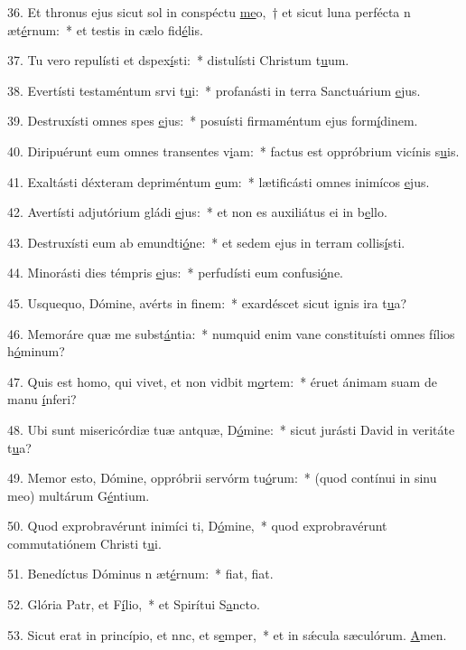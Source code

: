 36. Et thronus ejus sicut sol in conspéctu \uline{me}o,~† et sicut luna perfécta n æt\uline{é}rnum:~* et testis in cælo fid\uline{é}lis.\par 
37. Tu vero repulísti et dspex\uline{í}sti:~* distulísti Christum t\uline{u}um.\par 
38. Evertísti testaméntum srvi t\uline{u}i:~* profanásti in terra Sanctuárium \uline{e}jus.\par 
39. Destruxísti omnes spes \uline{e}jus:~* posuísti firmaméntum ejus form\uline{í}dinem.\par 
40. Diripuérunt eum omnes transentes v\uline{i}am:~* factus est oppróbrium vicínis s\uline{u}is.\par 
41. Exaltásti déxteram depriméntum \uline{e}um:~* lætificásti omnes inimícos \uline{e}jus.\par 
42. Avertísti adjutórium gládi \uline{e}jus:~* et non es auxiliátus ei in b\uline{e}llo.\par 
43. Destruxísti eum ab emundti\uline{ó}ne:~* et sedem ejus in terram collis\uline{í}sti.\par 
44. Minorásti dies témpris \uline{e}jus:~* perfudísti eum confusi\uline{ó}ne.\par 
45. Usquequo, Dómine, avérts in f\uline{i}nem:~* exardéscet sicut ignis ira t\uline{u}a?\par 
46. Memoráre quæ me subst\uline{á}ntia:~* numquid enim vane constituísti omnes fílios h\uline{ó}minum?\par 
47. Quis est homo, qui vivet, et non vidbit m\uline{o}rtem:~* éruet ánimam suam de manu \uline{í}nferi?\par 
48. Ubi sunt misericórdiæ tuæ antquæ, D\uline{ó}mine:~* sicut jurásti David in veritáte t\uline{u}a?\par 
49. Memor esto, Dómine, oppróbrii servórm tu\uline{ó}rum:~* (quod contínui in sinu meo) multárum G\uline{é}ntium.\par 
50. Quod exprobravérunt inimíci ti, D\uline{ó}mine,~* quod exprobravérunt commutatiónem Christi t\uline{u}i.\par 
51. Benedíctus Dóminus n æt\uline{é}rnum:~* fiat, f\uline{i}at.\par 
52. Glória Patr, et F\uline{í}lio,~* et Spirítui S\uline{a}ncto.\par 
53. Sicut erat in princípio, et nnc, et s\uline{e}mper,~* et in sǽcula sæculórum. \uline{A}men.\par 
